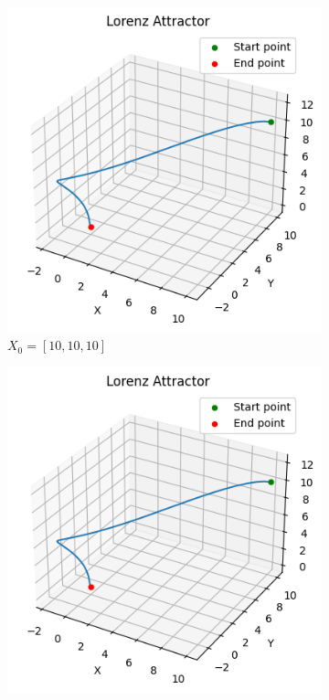 \begin{itemize}
\begin{figure}[H]
    \centering
    \begin{subfigure}[b]{0.45\textwidth}
        \centering
        \includegraphics[width=\textwidth]{images/ex4task4_lorenz_4.png}
        \caption{$X_0=[10,10,10]$}
        \label{fig:lorenz_4}
    \end{subfigure}
    \begin{subfigure}[b]{0.45\textwidth}
        \centering
        \includegraphics[width=\textwidth]{images/ex4_task4_lorenz_5.png}

\end{subfigure}
\end{figure}
\end{itemize}
